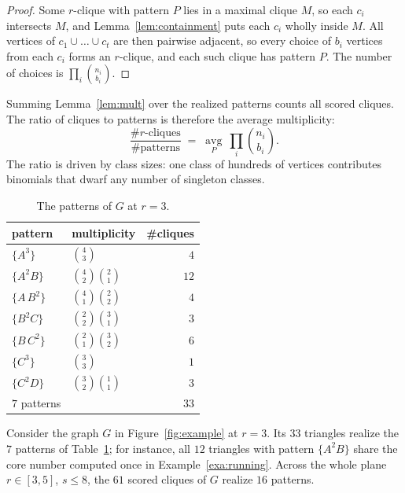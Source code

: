 \begin{proof}
Some $r$-clique with pattern $P$ lies in a maximal clique $M$, so each $c_i$ intersects $M$, and Lemma~\ref{lem:containment} puts each $c_i$ wholly inside $M$.
%
All vertices of $c_1\cup\dots\cup c_t$ are then pairwise adjacent, so every choice of $b_i$ vertices from each $c_i$ forms an $r$-clique, and each such clique has pattern $P$.
%
The number of choices is $\prod_i\binom{n_i}{b_i}$.
\end{proof}

Summing Lemma~\ref{lem:mult} over the realized patterns counts all scored cliques.
%
The ratio of cliques to patterns is therefore the average multiplicity:
\begin{equation}\label{eq:compression}
\frac{\#r\text{-cliques}}{\#\text{patterns}}
\;=\;
\operatorname*{avg}_{P}\ \prod_{i}\binom{n_i}{b_i}.
\end{equation}
The ratio is driven by class sizes: one class of hundreds of vertices contributes binomials that dwarf any number of singleton classes.

\begin{table}[t]
\centering
\caption{The patterns of $G$ at $r=3$.}\label{tab:patterns}
\small
\begin{tabular}{@{}llr@{}}
\toprule
pattern & multiplicity & \#cliques\\
\midrule
$\{A^3\}$ & $\binom{4}{3}$ & $4$\\
$\{A^2 B\}$ & $\binom{4}{2}\binom{2}{1}$ & $12$\\
$\{A\,B^2\}$ & $\binom{4}{1}\binom{2}{2}$ & $4$\\
$\{B^2 C\}$ & $\binom{2}{2}\binom{3}{1}$ & $3$\\
$\{B\,C^2\}$ & $\binom{2}{1}\binom{3}{2}$ & $6$\\
$\{C^3\}$ & $\binom{3}{3}$ & $1$\\
$\{C^2 D\}$ & $\binom{3}{2}\binom{1}{1}$ & $3$\\
\midrule
$7$ patterns & & $33$\\
\bottomrule
\end{tabular}
\end{table}

\begin{example}\label{exa:patterns}
Consider the graph $G$ in Figure~\ref{fig:example} at $r=3$.
%
Its $33$ triangles realize the $7$ patterns of Table~\ref{tab:patterns}; for instance, all $12$ triangles with pattern $\{A^2B\}$ share the core number computed once in Example~\ref{exa:running}.
%
Across the whole plane $r\in[3,5]$, $s\le8$, the $61$ scored cliques of $G$ realize $16$ patterns.
\end{example}

